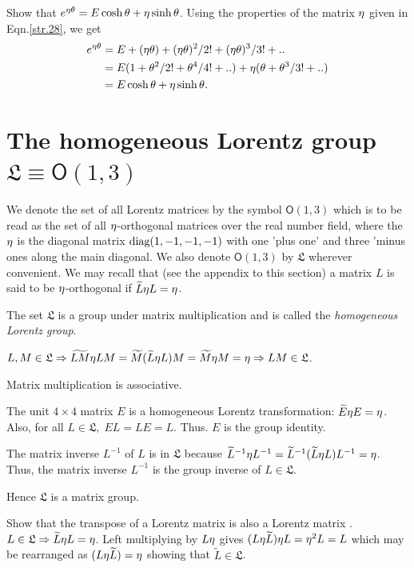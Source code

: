 \begin{small}
\exm  Show that $e^{{\eta} {\theta}}=E\cosh{\theta}+{\eta} \sinh {\theta}$.
\soln Using the properties of the matrix ${\eta}$ given in 
Eqn.\eqref{str.28}, we get
\begin{align*} 
e^{{\eta} {\theta}}&=
E+({\eta}{\theta})+({\eta}{\theta})^2/2!+({\eta}{\theta}) ^3/3!+..\\
&=E(1+{\theta}^2/2!+{\theta}^4/4!+..) +{\eta}(
{\theta} +{\theta}^3/3!+..)\\&=E\cosh{\theta} +{\eta} \sinh{\theta}.
\end{align*}\ebx

\vspace{-.2cm}

\section{The homogeneous Lorentz group\\ {$\mathfrak{L}\equiv 
\mathsf{O}(1,3)$}{}} We 
denote the set of all Lorentz matrices by the symbol 
$\mathsf{O}(1,3)$ which is to be read as the set of all 
${\eta}$-orthogonal matrices over the real number field, 
where 
the ${\eta}$ is the diagonal matrix  $\mbox{diag} (1,-1,-1,-1)$ 
with 
one 'plus one' and three 'minus ones along the main 
diagonal. We also denote $\mathsf{O}(1,3)$ by  
$\mathfrak{L}$ wherever convenient. We may recall that (see 
the appendix to this section) a matrix $L$ is said to be 
${\eta}$-orthogonal if $\widetilde{L}{\eta} L ={\eta}$.

\lem The set $\mathfrak{L}$ is a group under matrix
multiplication and is called the \textsl{homogeneous Lorentz
group}.

\prf {} $L,M \in \mathfrak{L} \Rightarrow
\widetilde{LM}{\eta} LM=\widetilde{M}(\widetilde{L}{\eta} L)M=\widetilde{M}{\eta} M={\eta}
\Rightarrow LM \in \mathfrak{L}$.

Matrix multiplication is associative.

 The unit $4\times 4$ matrix $E$ is a 
homogeneous Lorentz transformation: $\widetilde{E}{\eta} 
E={\eta}$. Also, for all $L\in \mathfrak{L},\; EL=LE=L$. 
Thus. $E$ is the group identity.

 The matrix inverse $L^{-1}$ of $L$ is in  
$\mathfrak{L}$ because $\widetilde{L}^{-1}{\eta} 
L^{-1}=\widetilde{L}^{-1}({\widetilde{L}}{\eta} L) L^{-1} ={\eta}$. Thus,  
the 
matrix inverse $L^{-1}$ is the group inverse of $L \in 
\mathfrak{L}$.

Hence $\mathfrak{L}$ is a matrix group.

\exm Show that the transpose of a Lorentz matrix is also a 
Lorentz matrix . 
\soln  $L \in \mathfrak{L} \Rightarrow \widetilde{L} {\eta} L = 
{\eta}$. Left multiplying by $L{\eta}$ gives $(L {\eta} 
\widetilde{L}){\eta} L = {\eta}^2 L = L$ which may be rearranged as 
$(L {\eta} \widetilde{L})={\eta}$ showing that $ \tilde{L} \in 
\mathfrak{L}$.\ebx


\end{small}
